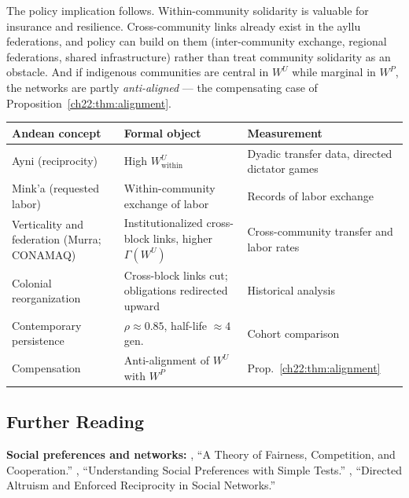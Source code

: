 \documentclass[../structural_economics_book.tex]{subfiles}
\begin{document}
The policy implication follows. Within-community solidarity is valuable for insurance and resilience. Cross-community links already exist in the ayllu federations, and policy can build on them (inter-community exchange, regional federations, shared infrastructure) rather than treat community solidarity as an obstacle. And if indigenous communities are central in $W^U$ while marginal in $W^P$, the networks are partly \emph{anti-aligned} --- the compensating case of Proposition~\ref{ch22:thm:alignment}.

\begin{center}
\begin{tabularx}{\textwidth}{LLL}
\toprule
\textbf{Andean concept} & \textbf{Formal object} & \textbf{Measurement} \\
\midrule
Ayni (reciprocity) & High $W^U_{\text{within}}$ & Dyadic transfer data, directed dictator games \\
Mink'a (requested labor) & Within-community exchange of labor & Records of labor exchange \\
Verticality and federation (Murra; CONAMAQ) & Institutionalized cross-block links, higher $\Gamma(W^U)$ & Cross-community transfer and labor rates \\
Colonial reorganization & Cross-block links cut; obligations redirected upward & Historical analysis \\
Contemporary persistence & $\rho \approx 0.85$, half-life $\approx 4$ gen. & Cohort comparison \\
Compensation & Anti-alignment of $W^U$ with $W^P$ & Prop.~\ref{ch22:thm:alignment} \\
\bottomrule
\end{tabularx}
\end{center}


\subsection*{Further Reading}

\textbf{Social preferences and networks:} \citet{fehr1999theory}, ``A Theory of Fairness, Competition, and Cooperation.'' \citet{charness2002understanding}, ``Understanding Social Preferences with Simple Tests.'' \citet{leider2009directed}, ``Directed Altruism and Enforced Reciprocity in Social Networks.''
\end{document}
